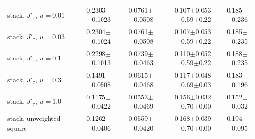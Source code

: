 {\begin{tabular}{lrrrr}
stack, $J'_\tau$, $u=0.01$ & 0.2303$\pm$0.1023 & 0.0761$\pm$0.0508 & \shortstack{0.107$\pm$0.053\\0.59$\pm$0.22} & 0.185$\pm$0.236 \\
stack, $J'_\tau$, $u=0.03$ & 0.2304$\pm$0.1024 & 0.0761$\pm$0.0508 & \shortstack{0.107$\pm$0.053\\0.59$\pm$0.22} & 0.185$\pm$0.235 \\
stack, $J'_\tau$, $u=0.1$ & 0.2298$\pm$0.1013 & 0.0739$\pm$0.0463 & \shortstack{0.110$\pm$0.052\\0.59$\pm$0.22} & 0.188$\pm$0.235 \\
stack, $J'_\tau$, $u=0.3$ & 0.1491$\pm$0.0508 & 0.0615$\pm$0.0468 & \shortstack{0.117$\pm$0.048\\0.69$\pm$0.03} & 0.183$\pm$0.196 \\
stack, $J'_\tau$, $u=1.0$ & 0.1175$\pm$0.0422 & 0.0553$\pm$0.0469 & \shortstack{0.156$\pm$0.032\\0.70$\pm$0.00} & 0.152$\pm$0.032 \\
stack, unweighted square & 0.1262$\pm$0.0406 & 0.0559$\pm$0.0420 & \shortstack{0.168$\pm$0.039\\0.70$\pm$0.00} & 0.194$\pm$0.095 \\
\bottomrule
\end{tabular}}

